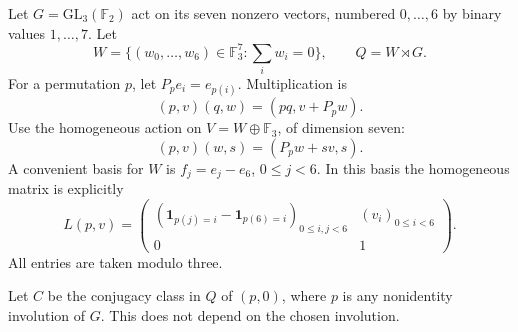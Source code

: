 \documentclass[11pt]{article}
\newcommand{\F}{\mathbb F}
\begin{document}
Let $G=\mathrm{GL}_3(\F_2)$ act on its seven nonzero vectors, numbered
$0,\ldots,6$ by binary values $1,\ldots,7$.
Let
\[
 W=\{(w_0,\ldots,w_6)\in\F_3^7:\textstyle\sum_iw_i=0\},
 \qquad Q=W\rtimes G.
\]
For a permutation $p$, let $P_pe_i=e_{p(i)}$. Multiplication is
\[
             (p,v)(q,w)=(pq,v+P_pw).
\]
Use the homogeneous action on $V=W\oplus\F_3$, of dimension seven:
\[
                   (p,v)(w,s)=(P_pw+sv,s).
\]
A convenient basis for $W$ is $f_j=e_j-e_6$, $0\le j<6$.
In this basis the homogeneous matrix is explicitly
\begin{equation}\label{eq:matrix}
 L(p,v)=
 \begin{pmatrix}
  (\mathbf1_{p(j)=i}-\mathbf1_{p(6)=i})_{0\le i,j<6}
       &(v_i)_{0\le i<6}\\
  0&1
 \end{pmatrix}.
\end{equation}
All entries are taken modulo three.

Let $C$ be the conjugacy class in $Q$ of $(p,0)$, where $p$ is any
nonidentity involution of $G$. This does not depend on the chosen
involution.
\end{document}
